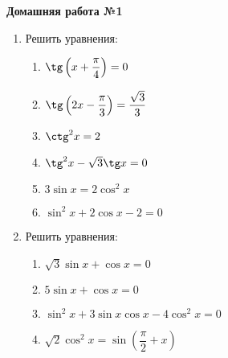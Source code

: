 \documentclass[12pt, a4paper]{article}
\begin{document}
	   \cfoot{}
	\begin{center}
		\Large
		\textbf{Домашняя работа №1}
	\end{center}
	\begin{enumerate}[label=\textbf{\arabic*.}]
		\item Решить уравнения:
		\begin{multicols}{2}
			\begin{enumerate}[label=\asbuk*)]
				\item \( \tg\left( x+\dfrac{\pi}{4} \right) = 0 \)
				\item \( \tg\left( 2x-\dfrac{\pi}{3} \right)=\dfrac{\sqrt{3}}{3} \)
				\item \( \ctg^2 x = 2 \)
				\item \( \tg^2 x - \sqrt{3}\tg x = 0 \)
				\item \( 3\sin x = 2\cos^2 x \)
				\item \( \sin^2 x + 2\cos x - 2 = 0 \)
			\end{enumerate}
		\end{multicols}
		\item Решить уравнения:
		\begin{multicols}{2}
			\begin{enumerate}[label=\asbuk*)]
				\item \( \sqrt{3}\sin x + \cos x = 0 \)
				\item \( 5\sin x + \cos x = 0 \)
				\item \( \sin^2 x + 3\sin x\cos x - 4\cos^2 x = 0\)
				\item \( \sqrt{2}\cos^2x=\sin\left( \dfrac{\pi}{2}+x \right) \)
			\end{enumerate}
		\end{multicols}
	\end{enumerate}
\end{document}
